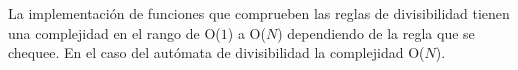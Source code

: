 La implementación de funciones que comprueben las reglas de divisibilidad tienen una complejidad en el rango de O($1$) a O($N$) dependiendo de la regla que se chequee. En el caso del autómata de divisibilidad la complejidad O($N$).